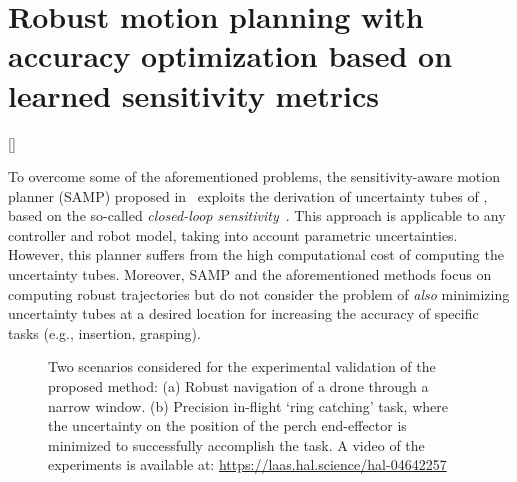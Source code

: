 \chapter{Robust motion planning with accuracy optimization based on learned sensitivity metrics}[]

To overcome some of the aforementioned problems, the sensitivity-aware motion planner (SAMP) proposed in~\cite{cSAMP} exploits the derivation of uncertainty tubes of \cite{cTube}, based on the so-called \emph{closed-loop sensitivity}~\cite{cPi,cTh}.
This approach is applicable to any controller and robot model, taking into account parametric uncertainties. 
However, this planner suffers from the high computational cost of computing the uncertainty tubes.
Moreover, SAMP and the aforementioned methods focus on computing robust trajectories but do not consider the problem of \emph{also} minimizing uncertainty tubes at a desired location for increasing the accuracy of specific tasks (e.g., insertion, grasping).

\begin{figure} [t]
    \centering
    \caption{
    Two scenarios considered for the experimental validation of the proposed method:
    (a) Robust navigation of a drone through a narrow window. (b) Precision in-flight `ring catching' task, where the uncertainty on the position of the perch end-effector is minimized to successfully accomplish the task.
    A video of the experiments is available at: \href{https://laas.hal.science/hal-04642257}{https://laas.hal.science/hal-04642257}}%
    \label{fig: Missed and succes}%
\end{figure}


